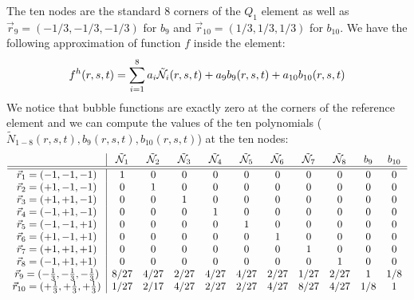 The ten nodes are the standard 8 corners of the $Q_1$ element as well  
as $\vec{r}_9=(-1/3,-1/3,-1/3)$ for $b_9$ and 
$\vec{r}_{10}=(1/3,1/3,1/3)$ for $b_{10}$.
We have the following approximation of function $f$ inside the element:
\[
f^h(r,s,t) = \sum_{i=1}^{8} a_i \tilde{{\mathcal{N}}}_i(r,s,t) + a_9 b_9(r,s,t) + a_{10} b_{10}(r,s,t)
\]
We notice that bubble functions are exactly zero at the corners of the reference element and
we can compute the values of the ten polynomials ($\tilde{N}_{1-8}(r,s,t),b_9(r,s,t),b_{10}(r,s,t)$) 
at the ten nodes:
\[
\begin{array}{c|cccccccccc}
 & \tilde{{\mathcal{N}}}_1 & \tilde{{\mathcal{N}}}_2 & \tilde{{\mathcal{N}}}_3 & \tilde{{\mathcal{N}}}_4 & \tilde{{\mathcal{N}}}_5 
 & \tilde{{\mathcal{N}}}_6 & \tilde{{\mathcal{N}}}_7 & \tilde{{\mathcal{N}}}_8 & b_9 & b_{10}\\
 \hline\hline
\vec{r}_1=(-1,-1,-1)    &1 &0 &0 &0 &0 &0 &0 &0 &0 &0 \\
\vec{r}_2=(+1,-1,-1)    &0 &1 &0 &0 &0 &0 &0 &0 &0 &0 \\
\vec{r}_3=(+1,+1,-1)    &0 &0 &1 &0 &0 &0 &0 &0 &0 &0 \\
\vec{r}_4=(-1,+1,-1)    &0 &0 &0 &1 &0 &0 &0 &0 &0 &0 \\
\vec{r}_5=(-1,-1,+1)    &0 &0 &0 &0 &1 &0 &0 &0 &0 &0 \\
\vec{r}_6=(+1,-1,+1)    &0 &0 &0 &0 &0 &1 &0 &0 &0 &0 \\
\vec{r}_7=(+1,+1,+1)    &0 &0 &0 &0 &0 &0 &1 &0 &0 &0 \\
\vec{r}_8=(-1,+1,+1)    &0 &0 &0 &0 &0 &0 &0 &1 &0 &0 \\
\vec{r}_9=(-\frac13,-\frac13,-\frac13)    &8/27 & 4/27 & 2/27  & 4/27 & 4/27 & 2/27& 1/27& 2/27 &1 & 1/8\\
\vec{r}_{10}=(+\frac13,+\frac13,+\frac13) &1/27 & 2/17 & 4/27 & 2/27 & 2/27& 4/27& 8/27& 4/27& 1/8  &1 \\
\end{array}
\]




